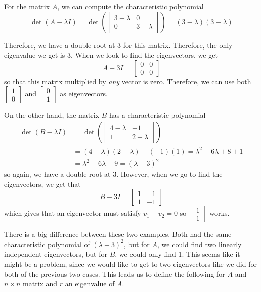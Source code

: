 \begin{exampleSol}
For the matrix $A$, we can compute the characteristic polynomial
\[ \det(A - \lambda I) = \det \left( \begin{bmatrix} 3-\lambda &0 \\ 0 & 3 - \lambda \end{bmatrix}\right) = (3 - \lambda)(3 - \lambda) \]

Therefore, we have a double root at $3$ for this matrix. Therefore, the only eigenvalue we get is $3$. When we look to find the eigenvectors, we get 
\[ A - 3 I = \begin{bmatrix} 0 & 0 \\ 0 & 0 \end{bmatrix} \] so that this matrix multiplied by \emph{any} vector is zero. Therefore, we can use both $\begin{bmatrix} 1 \\ 0 \end{bmatrix}$ and $\begin{bmatrix} 0 \\ 1 \end{bmatrix}$ as eigenvectors. 

On the other hand, the matrix $B$ has a characteristic polynomial 
\[ \begin{split}
\det(B - \lambda I) &= \det\left( \begin{bmatrix} 4 - \lambda & -1 \\ 1 & 2 - \lambda \end{bmatrix} \right) \\
&= (4-\lambda)(2-\lambda) - (-1)(1) = \lambda^2 - 6\lambda + 8 + 1 \\
&= \lambda^2 - 6\lambda + 9 = (\lambda - 3)^2 
\end{split}
\]
so again, we have a double root at $3$. However, when we go to find the eigenvectors, we get that
\[ B - 3 I = \begin{bmatrix} 1 & -1 \\ 1 & -1 \end{bmatrix} \] which gives that an eigenvector must satisfy $v_1 - v_2 = 0$ so $\begin{bmatrix} 1 \\ 1 \end{bmatrix}$ works. 
\end{exampleSol}

There is a big difference between these two examples. Both had the same characteristic polynomial of $(\lambda - 3)^2$, but for $A$, we could find two linearly independent eigenvectors, but for $B$, we could only find 1. This seems like it might be a problem, since we would like to get to two eigenvectors like we did for both of the previous two cases. This leads us to define the following for $A$ and $n \times n$ matrix and $r$ an eigenvalue of $A$. 

